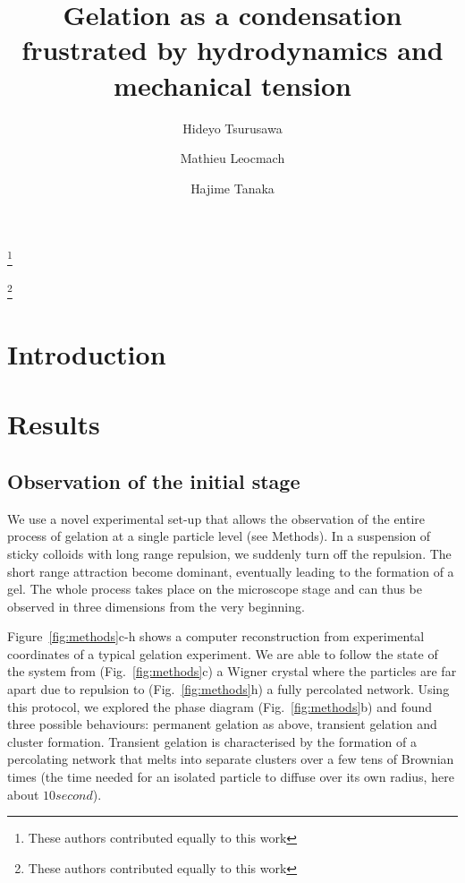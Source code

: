 



\title{Gelation as a condensation frustrated by hydrodynamics and mechanical tension}
\author{Hideyo Tsurusawa}
\thanks{These authors contributed equally to this work}
\author{Mathieu Leocmach}
\thanks{These authors contributed equally to this work}
\author{Hajime Tanaka}

\begin{abstract}

\end{abstract}

\maketitle

\section*{Introduction} 



\section*{Results}

\subsection*{Observation of the initial stage}

We use a novel experimental set-up that allows the observation of the entire process of gelation at a single particle level (see Methods). In a suspension of sticky colloids with long range repulsion, we suddenly turn off the repulsion. The short range attraction become dominant, eventually leading to the formation of a gel. The whole process takes place on the microscope stage and can thus be observed in three dimensions from the very beginning.

Figure~\ref{fig:methods}c-h shows a computer reconstruction from experimental coordinates of a typical gelation experiment. We are able to follow the state of the system from (Fig.~\ref{fig:methods}c) a Wigner crystal where the particles are far apart due to repulsion to (Fig.~\ref{fig:methods}h) a fully percolated network. Using this protocol, we explored the phase diagram (Fig.~\ref{fig:methods}b) and found three possible behaviours: permanent gelation as above, transient gelation and cluster formation. Transient gelation is characterised by the formation of a percolating network that melts into separate clusters over a few tens of Brownian times (the time needed for an isolated particle to diffuse over its own radius, here about $\unit{10}{second}$).

